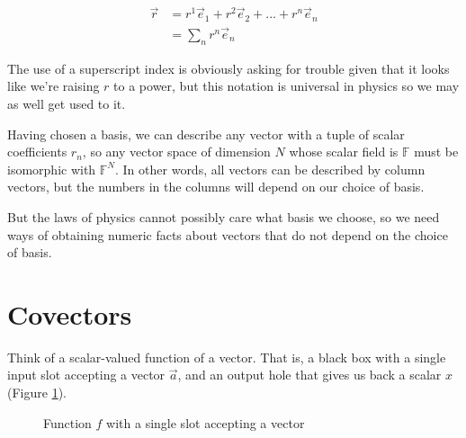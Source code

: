 \begin{equation}
\begin{split}
\vec{r} &= r^1 \vec{e}_1 + r^2 \vec{e}_2 + ... + r^n \vec{e}_n \\
        &= \sum_n r^n \vec{e}_n
\end{split}
\end{equation}

The use of a superscript index is obviously asking for trouble given that it looks like we're raising $r$ to a power, but this notation is universal in physics so we may as well get used to it.

Having chosen a basis, we can describe any vector with a tuple of scalar coefficients $r_n$, so any vector space of dimension $N$ whose scalar field is $\mathbb{F}$ must be isomorphic with $\mathbb{F}^N$. In other words, all vectors can be described by column vectors, but the numbers in the columns will depend on our choice of basis.

But the laws of physics cannot possibly care what basis we choose, so we need ways of obtaining numeric facts about vectors that do not depend on the choice of basis.

\section{Covectors}

Think of a scalar-valued function of a vector. That is, a black box with a single input slot accepting a vector $\vec{a}$, and an output hole that gives us back a scalar $x$ (Figure \ref{fig:1-slot-box}).

\begin{figure}[h]
    \centering
    \caption{Function $f$ with a single slot accepting a vector} \label{fig:1-slot-box}
\end{figure}


